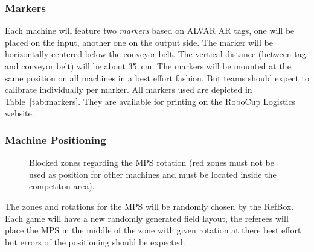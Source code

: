 \documentclass[12pt,twoside]{article}
\newcommand{\reftab}[1]{Table~\ref{#1}}
\begin{document}
\subsubsection{Markers}
\label{sec:markers}
Each machine will feature two \emph{markers} based on ALVAR AR tags,
one will be placed on the input, another one on the output side. The
marker will be horizontally centered below the conveyor belt. The
vertical distance (between tag and conveyor belt) will be about 
\SI{35}{\centi\metre}. The markers will be mounted at the same position 
on all machines in a best effort fashion. But teams should expect to 
calibrate individually per marker. All markers used are depicted in 
\reftab{tab:markers}. They are available for printing on the RoboCup 
Logistics website.


\subsubsection{Machine Positioning}
\label{sec:machine-swapping}
\begin{figure}[b!]
    \centering
    \quad
    \caption{Blocked zones regarding the MPS rotation (red zones must
      not be used as position for other machines and must be located inside the competiton area).}
    \label{fig:zone-mps-blocked}
\end{figure}
The zones and rotations for the MPS will be randomly chosen by the RefBox.
Each game will have a new randomly generated field layout, the referees will place the MPS in the middle of the zone with given rotation at there best effort but errors of the positioning should be expected.
\end{document}
